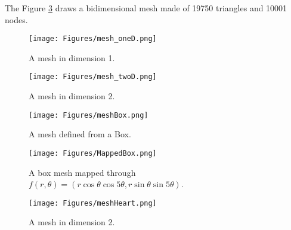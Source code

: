The Figure \ref{meshHeart} draws a bidimensional mesh made of 19750 triangles and 10001 nodes.

\begin{figure}[H]
  \begin{minipage}{9cm}
    \begin{center}
      \texttt{[image: Figures/mesh\_oneD.png]}
      \caption{A mesh in dimension 1.}
      \label{mesh_oneD}
    \end{center}
  \end{minipage}
  \hfill
  \begin{minipage}{9cm}
    \begin{center}
      \texttt{[image: Figures/mesh\_twoD.png]}
      \caption{A mesh in dimension 2.}
      \label{mesh_twoD}
    \end{center}
  \end{minipage}
\end{figure}



\begin{figure}[H]
  \begin{minipage}{9cm}
  \begin{center}
    \texttt{[image: Figures/meshBox.png]}
    \caption{A mesh defined from a Box.}
    \label{meshBox}
  \end{center}
  \end{minipage}
  \hfill
  \begin{minipage}{9cm}
  \begin{center}
    \texttt{[image: Figures/MappedBox.png]}
    \caption{A box mesh mapped through  $f(r,  \theta)=(r\cos \theta \cos 5\theta, r\sin \theta \sin 5\theta)$.}
    \label{MappedBox}
  \end{center}
  \end{minipage}
\end{figure}

\begin{figure}[H]
  \begin{center}
    \texttt{[image: Figures/meshHeart.png]}
    \caption{A mesh in dimension 2.}
    \label{meshHeart}
  \end{center}
\end{figure}